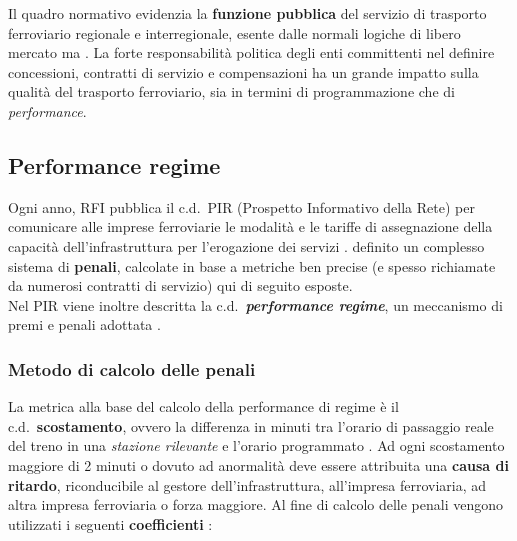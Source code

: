 \documentclass[12pt,italian]{report}
\begin{document}
Il quadro normativo evidenzia la \textbf{funzione pubblica} del
servizio di trasporto ferroviario regionale e interregionale, esente
dalle normali logiche di libero mercato ma
.
La forte responsabilità politica degli enti committenti nel definire
concessioni, contratti di servizio e compensazioni ha un grande
impatto sulla qualità del trasporto ferroviario, sia in termini di
programmazione che di \textit{performance}.

\subsection{Performance regime}
\label{performance_regime}

Ogni anno, RFI pubblica il c.d.\ PIR (Prospetto Informativo della
Rete) per comunicare alle imprese ferroviarie le modalità e le tariffe
di assegnazione della capacità dell'infrastruttura per l'erogazione
dei servizi \cite{RfiPir}.  %
definito un complesso sistema di \textbf{penali}, calcolate in base a
metriche ben precise (e spesso richiamate da numerosi contratti di
servizio) qui di seguito esposte. \\ Nel PIR viene inoltre descritta
la c.d.\ \textbf{\textit{performance regime}}, un meccanismo di premi
e penali adottata .
	
\subsubsection{Metodo di calcolo delle penali}

La metrica alla base del calcolo della performance di regime è il
c.d.\ \textbf{scostamento}, ovvero la differenza in minuti tra
l'orario di passaggio reale del treno in una \textit{stazione
    rilevante} e l'orario programmato \cite[app.\ 5.C,
\textit{``Definizioni''}]{RfiPir}.  Ad ogni scostamento maggiore di 2
minuti o dovuto ad anormalità deve essere attribuita una \textbf{causa
    di ritardo}, riconducibile al gestore dell'infrastruttura,
all'impresa ferroviaria, ad altra impresa ferroviaria o forza
maggiore.  Al fine di calcolo delle penali vengono utilizzati i
seguenti \textbf{coefficienti} \cite[app.\ 5.C, \textit{``Metodi di
    calcolo''}]{RfiPir}:
\end{document}
